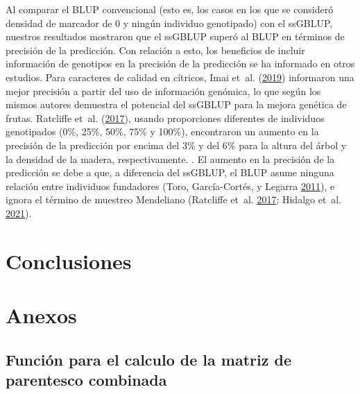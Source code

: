 \documentclass[11pt,spanish,a4paper,oneside,]{book} %
\begin{document}
Al comparar el BLUP convencional (esto es, los casos en los que se consideró densidad de marcador de 0 y ningún individuo genotipado) con el ssGBLUP, nuestros resultados mostraron que el ssGBLUP superó al BLUP en términos de precisión de la predicción. Con relación a esto, los beneficios de incluir información de genotipos en la precisión de la predicción se ha informado en otros estudios. Para caracteres de calidad en cítricos, Imai et~al. (\protect\hyperlink{ref-cite:20}{2019}) informaron una mejor precisión a partir del uso de información genómica, lo que según los mismos autores demuestra el potencial del ssGBLUP para la mejora genética de frutas. Ratcliffe et~al. (\protect\hyperlink{ref-cite:72}{2017}), usando proporciones diferentes de individuos genotipados (0\%, 25\%, 50\%, 75\% y 100\%), encontraron un aumento en la precisión de la predicción por encima del 3\% y del 6\% para la altura del árbol y la densidad de la madera, respectivamente. . El aumento en la precisión de la predicción se debe a que, a diferencia del ssGBLUP, el BLUP asume ninguna relación entre individuos fundadores (Toro, García-Cortés, y Legarra \protect\hyperlink{ref-cite:71}{2011}), e ignora el término de muestreo Mendeliano (Ratcliffe et~al. \protect\hyperlink{ref-cite:72}{2017}; Hidalgo et~al. \protect\hyperlink{ref-cite:89}{2021}).

\hypertarget{conclusiones}{%
\chapter{Conclusiones}\label{conclusiones}}

\hypertarget{appendix-appendix}{%
\appendix}


\hypertarget{anexos}{%
\chapter{Anexos}\label{anexos}}

\hypertarget{funciuxf3n-para-el-calculo-de-la-matriz-de-parentesco-combinada}{%
\section{Función para el calculo de la matriz de parentesco combinada}\label{funciuxf3n-para-el-calculo-de-la-matriz-de-parentesco-combinada}}
\end{document}
